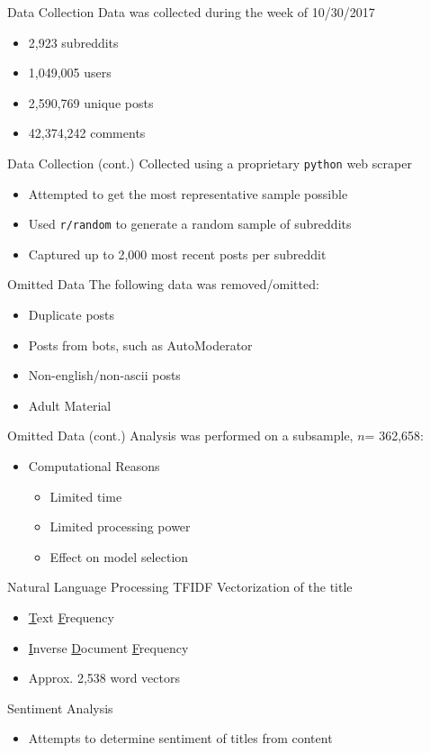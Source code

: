 \documentclass[10pt,t]{beamer}
\newcommand{\bi}{\begin{itemize}}                                 %
\newcommand{\ei}{\end{itemize}}                                   %
\begin{document}
\begin{frame}{Data Collection}
	Data was collected during the week of 10/30/2017
	\bi 
		\item 2,923 subreddits
		\item 1,049,005 users
		\item 2,590,769 unique posts
		\item 42,374,242 comments		
	\ei 
\end{frame}


\begin{frame}{Data Collection (cont.)}
	Collected using a proprietary \texttt{python} web scraper
	\bi
		\item Attempted to get the most representative sample possible
		\item Used \texttt{r/random} to generate a random sample of subreddits
		\item Captured up to 2,000 most recent posts per subreddit
	\ei	
\end{frame}


\begin{frame}{Omitted Data}
	The following data was removed/omitted:
	\bi				
		\item Duplicate posts
		\item Posts from bots, such as AutoModerator
		\item Non-english/non-ascii posts
		\item Adult Material
	\ei	
\end{frame}

\begin{frame}{Omitted Data (cont.)}
	Analysis was performed on a subsample, $n$= 362,658:
	\bi				
		\item Computational Reasons
			\bi
				\item Limited time
				\item Limited processing power
				\item Effect on model selection
			\ei
	\ei	
\end{frame}


\begin{frame}{Natural Language Processing}
TFIDF Vectorization of the title
	\bi
		\item \underline{T}ext \underline{F}requency
		\item \underline{I}nverse \underline{D}ocument \underline{F}requency
		\item Approx. 2,538 word vectors
	\ei

Sentiment Analysis
	\bi
		\item Attempts to determine sentiment of titles from content
	\ei

\end{frame}
\end{document}
